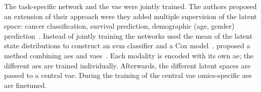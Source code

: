 \documentclass[../main.tex]{subfiles}
\begin{document}
		The task-specific network and the \gls{vae} were jointly trained.
		The authors proposed an extension of their approach were they added multiple supervision of the latent space: cancer classification, survival prediction, demographic (age, gender) prediction~\cite{Zhang2021}.
		Instead of jointly training the networks \citeauthor{Hira2021} used the mean of the latent state distributions to construct an \gls{svm} classifier and a Cox model~\cite{Hira2021}.
		\citeauthor{customics} proposed a method combining \glspl{ae} and \glspl{vae}~\cite{customics}.
		Each modality is encoded with its own \gls{ae}; the different \glspl{ae} are trained individually.
		Afterwards, the different latent spaces are passed to a central \gls{vae}.
		During the training of the central \gls{vae} omics-specific \glspl{ae} are finetuned.
\end{document}
